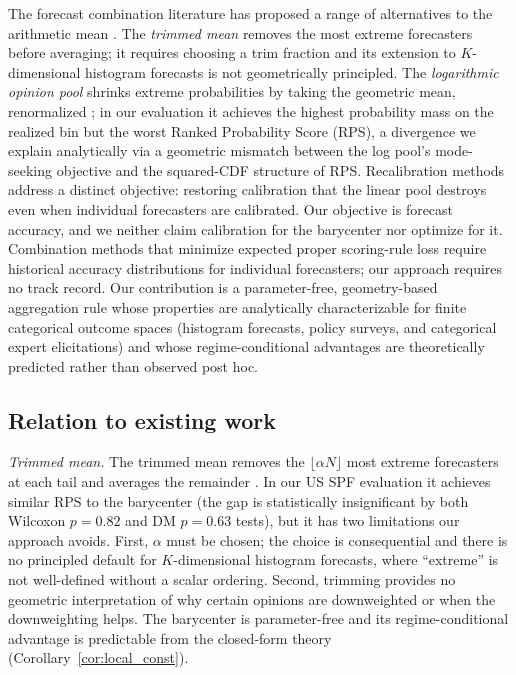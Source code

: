 The forecast combination literature has proposed a range of alternatives to the arithmetic mean \cite{clemen89,timmermann06}.  The \emph{trimmed mean} removes the most extreme forecasters before averaging; it requires choosing a trim fraction and its extension to $K$-dimensional histogram forecasts is not geometrically principled.  The \emph{logarithmic opinion pool} shrinks extreme probabilities by taking the geometric mean, renormalized \cite{genest86}; in our evaluation it achieves the highest probability mass on the realized bin but the worst Ranked Probability Score (RPS), a divergence we explain analytically via a geometric mismatch between the log pool's mode-seeking objective and the squared-CDF structure of RPS.  Recalibration methods \cite{ranjan10,gneiting13} address a distinct objective: restoring calibration that the linear pool destroys even when individual forecasters are calibrated.  Our objective is forecast accuracy, and we neither claim calibration for the barycenter nor optimize for it.  Combination methods that minimize expected proper scoring-rule loss \cite{gneiting07} require historical accuracy distributions for individual forecasters; our approach requires no track record.  Our contribution is a parameter-free, geometry-based aggregation rule whose properties are analytically characterizable for finite categorical outcome spaces (histogram forecasts, policy surveys, and categorical expert elicitations) and whose regime-conditional advantages are theoretically predicted rather than observed post hoc.

\subsection*{Relation to existing work}

\textit{Trimmed mean.}  The trimmed mean removes the $\lfloor\alpha N\rfloor$ most extreme forecasters at each tail and averages the remainder \cite{lahiri15}.  In our US SPF evaluation it achieves similar RPS to the barycenter (the gap is statistically insignificant by both Wilcoxon $p = 0.82$ and DM $p = 0.63$ tests), but it has two limitations our approach avoids.  First, $\alpha$ must be chosen; the choice is consequential and there is no principled default for $K$-dimensional histogram forecasts, where ``extreme'' is not well-defined without a scalar ordering.  Second, trimming provides no geometric interpretation of why certain opinions are downweighted or when the downweighting helps.  The barycenter is parameter-free and its regime-conditional advantage is predictable from the closed-form theory (Corollary~\ref{cor:local_const}).

